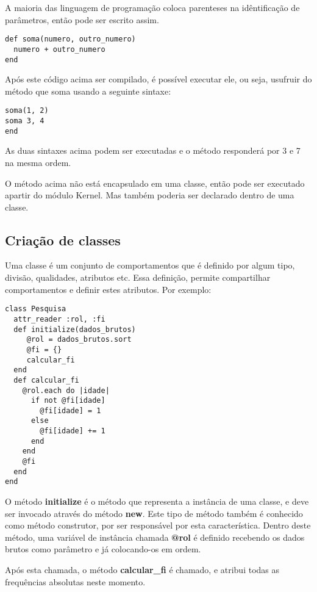 \documentclass[12pt]{article}
\newcommand{\code}[1] {\textbf{#1}}
\begin{document}
A maioria das linguagem de programação coloca parenteses na idêntificação de parâmetros, então pode ser escrito assim.

\begin{lstlisting}[caption=implementando um método de soma usando parenteses alternativo]
def soma(numero, outro_numero)
  numero + outro_numero
end
\end{lstlisting}

Após este código acima ser compilado, é possível executar ele, ou seja, usufruir do método que soma usando a seguinte sintaxe:

\begin{lstlisting}[caption=usufruindo do método de soma]
soma(1, 2)
soma 3, 4
end
\end{lstlisting}

As duas sintaxes acima podem ser executadas e o método responderá por 3 e 7 na mesma ordem.

O método acima não está encapsulado em uma classe, então pode ser executado apartir do módulo Kernel. Mas também poderia ser declarado dentro de uma classe.

\subsection{Criação de classes}

Uma classe é um conjunto de comportamentos que é definido por algum tipo, divisão, qualidades, atributos etc. Essa definição, permite compartilhar comportamentos e definir estes atributos. Por exemplo:

\begin{lstlisting}[caption=Criando uma classe, label=classePesquisa]
class Pesquisa
  attr_reader :rol, :fi
  def initialize(dados_brutos)
     @rol = dados_brutos.sort
     @fi = {}
     calcular_fi
  end
  def calcular_fi
    @rol.each do |idade|
      if not @fi[idade]
        @fi[idade] = 1
      else
        @fi[idade] += 1
      end
    end
    @fi
  end
end
\end{lstlisting}

O método \code{initialize} é o método que representa a instância de uma classe, e deve ser invocado através do método \code{new}. Este tipo de método também é conhecido como método construtor, por ser responsável por esta característica. Dentro deste método, uma variável de instância chamada \code{@rol} é definido recebendo os dados brutos como parâmetro e já colocando-os em ordem.

Após esta chamada, o método \code{calcular\_fi} é chamado, e atribui todas as frequências absolutas neste momento. 
\end{document}

